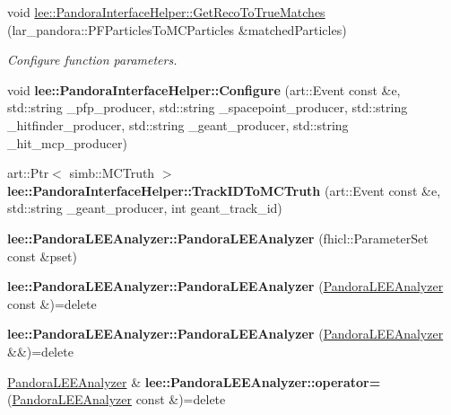 \begin{DoxyCompactItemize}
\item 
void \hyperlink{group__lee_gaedec8759b64e578d4d27e4dd57bc2111}{lee\-::\-Pandora\-Interface\-Helper\-::\-Get\-Reco\-To\-True\-Matches} (lar\-\_\-pandora\-::\-P\-F\-Particles\-To\-M\-C\-Particles \&matched\-Particles)
\begin{DoxyCompactList}\small\item\em Configure function parameters. \end{DoxyCompactList}\item 
\hypertarget{group__lee_gacea920f6926b69221a6a04d17e38cbf9}{void {\bfseries lee\-::\-Pandora\-Interface\-Helper\-::\-Configure} (art\-::\-Event const \&e, std\-::string \-\_\-pfp\-\_\-producer, std\-::string \-\_\-spacepoint\-\_\-producer, std\-::string \-\_\-hitfinder\-\_\-producer, std\-::string \-\_\-geant\-\_\-producer, std\-::string \-\_\-hit\-\_\-mcp\-\_\-producer)}\label{group__lee_gacea920f6926b69221a6a04d17e38cbf9}

\item 
\hypertarget{group__lee_gaab1841058478f2ef51067eeb588d1711}{art\-::\-Ptr$<$ simb\-::\-M\-C\-Truth $>$ {\bfseries lee\-::\-Pandora\-Interface\-Helper\-::\-Track\-I\-D\-To\-M\-C\-Truth} (art\-::\-Event const \&e, std\-::string \-\_\-geant\-\_\-producer, int geant\-\_\-track\-\_\-id)}\label{group__lee_gaab1841058478f2ef51067eeb588d1711}

\item 
\hypertarget{group__lee_ga3783391baff0585de9261a559a8d28ef}{{\bfseries lee\-::\-Pandora\-L\-E\-E\-Analyzer\-::\-Pandora\-L\-E\-E\-Analyzer} (fhicl\-::\-Parameter\-Set const \&pset)}\label{group__lee_ga3783391baff0585de9261a559a8d28ef}

\item 
\hypertarget{group__lee_ga50f8e3ecdc7892d554c68080645af88c}{{\bfseries lee\-::\-Pandora\-L\-E\-E\-Analyzer\-::\-Pandora\-L\-E\-E\-Analyzer} (\hyperlink{classPandoraLEEAnalyzer}{Pandora\-L\-E\-E\-Analyzer} const \&)=delete}\label{group__lee_ga50f8e3ecdc7892d554c68080645af88c}

\item 
\hypertarget{group__lee_ga8e9dc3f96fcb2881bee2bfb46dcedaaf}{{\bfseries lee\-::\-Pandora\-L\-E\-E\-Analyzer\-::\-Pandora\-L\-E\-E\-Analyzer} (\hyperlink{classPandoraLEEAnalyzer}{Pandora\-L\-E\-E\-Analyzer} \&\&)=delete}\label{group__lee_ga8e9dc3f96fcb2881bee2bfb46dcedaaf}

\item 
\hypertarget{group__lee_gae71d8ba45ecaaa09a587ecf3cd693675}{\hyperlink{classPandoraLEEAnalyzer}{Pandora\-L\-E\-E\-Analyzer} \& {\bfseries lee\-::\-Pandora\-L\-E\-E\-Analyzer\-::operator=} (\hyperlink{classPandoraLEEAnalyzer}{Pandora\-L\-E\-E\-Analyzer} const \&)=delete}\label{group__lee_gae71d8ba45ecaaa09a587ecf3cd693675}


\end{DoxyCompactItemize}
